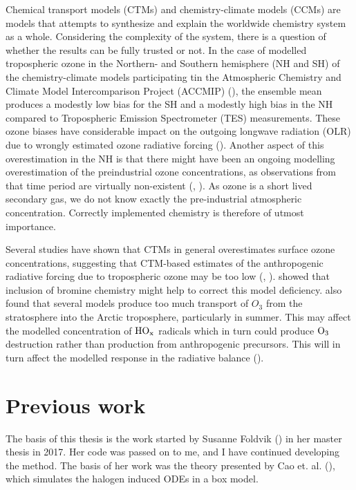 \medskip

Chemical transport models (CTMs) and chemistry-climate models (CCMs) are models that attempts to synthesize and explain the worldwide chemistry system as a whole. Considering the complexity of the system, there is a question of whether the results can be fully trusted or not. In the case of modelled tropospheric ozone in the Northern- and Southern hemisphere (NH and SH) of the chemistry-climate models participating tin the Atmospheric Chemistry and Climate Model Intercomparison Project (ACCMIP) (\cite{Bowman2013}), the ensemble mean produces a modestly low bias for the SH and a modestly high bias in the NH compared to Tropospheric Emission Spectrometer (TES) measurements. These ozone biases have considerable impact on the outgoing longwave radiation (OLR) due to wrongly estimated ozone radiative forcing (\cite{Bowman2013}). Another aspect of this overestimation in the NH is that there might have been an ongoing modelling overestimation of the preindustrial ozone concentrations, as observations from that time period are virtually non-existent (\cite{shindell2003}, \cite{Parrish2014}). As ozone is a short lived secondary gas, we do not know exactly the pre-industrial atmospheric concentration. Correctly implemented chemistry is therefore of utmost importance.

\medskip

Several studies have shown that CTMs in general overestimates surface ozone concentrations, suggesting that CTM-based estimates of the anthropogenic radiative forcing due to tropospheric ozone may be too low (\cite{WangJacob1998}, \cite{shindell2003}). \cite{Parella} showed that inclusion of bromine chemistry might help to correct this model deficiency. \cite{AMAP2015} also found that several models produce too much transport of $O_3$ from the stratosphere into the Arctic troposphere, particularly in summer. This may affect the modelled concentration of $\mathrm{HO_x}$ radicals which in turn could produce $\mathrm{O_3}$ destruction rather than production from anthropogenic precursors. This will in turn affect the modelled response in the radiative balance (\cite{AMAP2015}). 


\section{Previous work}

The basis of this thesis is the work started by Susanne Foldvik (\cite{Susanne}) in her master thesis in 2017. Her code was passed on to me, and I have continued developing the method. The basis of her work was the theory presented by Cao et. al. (\cite{CAO}), which simulates the halogen induced ODEs in a box model.  


